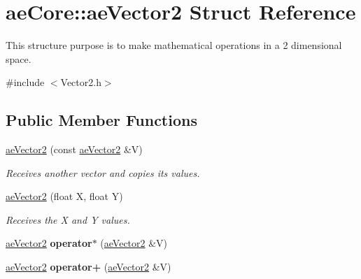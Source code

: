 \hypertarget{structae_core_1_1ae_vector2}{}\section{ae\+Core\+:\+:ae\+Vector2 Struct Reference}
\label{structae_core_1_1ae_vector2}


This structure purpose is to make mathematical operations in a 2 dimensional space.  




{\ttfamily \#include $<$Vector2.\+h$>$}

\subsection*{Public Member Functions}
\begin{DoxyCompactItemize}
\item 
\hyperlink{structae_core_1_1ae_vector2_ac5c856b5234ac30db8ec5b2e16fcc917}{ae\+Vector2} (const \hyperlink{structae_core_1_1ae_vector2}{ae\+Vector2} \&V)\hypertarget{structae_core_1_1ae_vector2_ac5c856b5234ac30db8ec5b2e16fcc917}{}\label{structae_core_1_1ae_vector2_ac5c856b5234ac30db8ec5b2e16fcc917}

\begin{DoxyCompactList}\small\item\em Receives another vector and copies its values. \end{DoxyCompactList}\item 
\hyperlink{structae_core_1_1ae_vector2_aefdaa829e69d7ee0b409c6eae7c00988}{ae\+Vector2} (float X, float Y)\hypertarget{structae_core_1_1ae_vector2_aefdaa829e69d7ee0b409c6eae7c00988}{}\label{structae_core_1_1ae_vector2_aefdaa829e69d7ee0b409c6eae7c00988}

\begin{DoxyCompactList}\small\item\em Receives the X and Y values. \end{DoxyCompactList}\item 
\hyperlink{structae_core_1_1ae_vector2}{ae\+Vector2} {\bfseries operator$\ast$} (\hyperlink{structae_core_1_1ae_vector2}{ae\+Vector2} \&V)\hypertarget{structae_core_1_1ae_vector2_a35dee1169b3fcb4d18a6e964f974fdfa}{}\label{structae_core_1_1ae_vector2_a35dee1169b3fcb4d18a6e964f974fdfa}

\item 
\hyperlink{structae_core_1_1ae_vector2}{ae\+Vector2} {\bfseries operator+} (\hyperlink{structae_core_1_1ae_vector2}{ae\+Vector2} \&V)\hypertarget{structae_core_1_1ae_vector2_a1f05fc5f463024521ae0e4567450f323}{}\label{structae_core_1_1ae_vector2_a1f05fc5f463024521ae0e4567450f323}


\end{DoxyCompactItemize}
